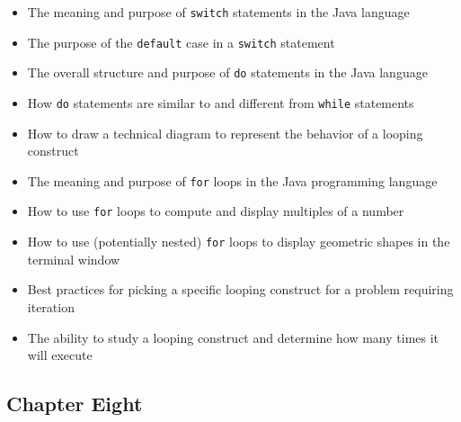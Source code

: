 \documentclass[11pt]{article}
\begin{document}
\begin{itemize}

  \item The meaning and purpose of {\tt switch} statements in the Java language
  \item The purpose of the {\tt default} case in a {\tt switch} statement
  \item The overall structure and purpose of {\tt do} statements in the Java language
  \item How {\tt do} statements are similar to and different from {\tt while} statements
  \item How to draw a technical diagram to represent the behavior of a looping construct
  \item The meaning and purpose of {\tt for} loops in the Java programming language
  \item How to use {\tt for} loops to compute and display multiples of a number
  \item How to use (potentially nested) {\tt for} loops to display geometric shapes in the terminal window
  \item Best practices for picking a specific looping construct for a problem requiring iteration
  \item The ability to study a looping construct and determine how many times it will execute

\end{itemize}

\subsection*{Chapter Eight}
\end{document}
